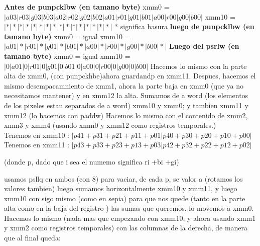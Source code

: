 \documentclass[a4paper]{article}
\begin{document}
	\textbf{ Antes de punpcklbw (en tamano byte)}
		\hfill \break
	xmm0 = $|a03|r03|g03|b03|a02|r02|g02|b02|a01|r01|g01|b01|a00|r00|g00|b00|$
		\hfill \break
	xmm10 = $|*|*|*|*|*|*|*|*|*|*|*|*|*|*|*|*|$
	\hfill \break
	\small{* significa basura}
	\hfill \break
\textbf{	luego de punpcklbw (en tamano byte)}
\hfill \break
	xmm0 = igual
	\hfill \break
	xmm10 = $|a01|*|r01|*|g01|*|b01|*|a00|*|r00|*|g00|*|b00|*|$
	\hfill \break
	\textbf{ Luego  del psrlw (en tamano byte)}
	\hfill \break
	 xmm0 = igual
	 \hfill \break
	 xmm10 = $|0|a01|0|r01|0|g01|0|b01|0|a00|0|r00|0|g00|0|b00|$
	\hfill \break
	Hacemos lo mismo con la parte alta de xmm0, (con punpckhbe)ahora guardandp en xmm11.
	\hfill \break
	Despues, hacemos el mismo desempacamniento de xmm1, ahora la parte baja en xmm0 (que ya no necesitamos mantener) y en xmm12 la alta.\hfill \break
	Sumamos de a word (los elementos de los pixeles estan separados de a word) xmm10 y xmm0; y tambien xmm11 y xmm12 (lo hacemos con paddw)
	Hacemos lo mismo con el contenido de xmm2, xmm3 y xmm4 (usando xmm0 y xmm12 como registros temporales.) \hfill \break
	\\
	Tenemos en xmm10 : $ |p41+p31+p21+p11+p01|p40+p30+p20+p10+p00|$\hfill \break
	Tenemos en xmm11 : $ |p43+p33+p23+p13+p03|p42+p32+p22+p12+p02|$
	
	
	(donde p, dado que i sea el numemo significa ri +bi +gi) \hfill \break
	
	usamos psllq en ambos (con 8) para vaciar, de cada p, se valor a (rotamos los valores tambien)
	luego sumamos horizontalmente xmm10 y xmm11, y luego xmm10 con sigo mismo (como en sepia) para que nos quede (tanto en la parte alta como en la baja del registro ) las sumas que queremos. lo movemos a xmm0. \hfill \break
	Hacemos lo mismo (nada mas que empezando con xmm10, y ahora usando xmm1 y xmm2 como registros temporales) con las columnas de la derecha, de manera que al final queda:\hfill \break
	
\end{document}

